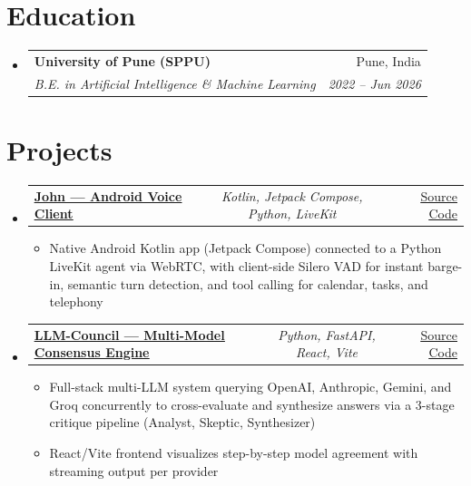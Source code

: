 \documentclass[a4paper,11pt]{article}
\makeatletter
\newcommand{\resumeItem}[1]{
  \item\small{#1}
}
\newcommand{\resumeItemListStart}{\begin{itemize}[rightmargin=0.11in]}
\newcommand{\resumeItemListEnd}{\end{itemize}}
\newcommand{\resumeTrioHeading}[3]{
  \item\small{
    \begin{tabular*}{0.96\textwidth}[t]{
      l@{\extracolsep{\fill}}c@{\extracolsep{\fill}}r
    }
      \textbf{#1} & \textit{#2} & #3
    \end{tabular*}
  }
}
\newcommand{\resumeQuadHeading}[4]{
  \item
  \begin{tabular*}{0.96\textwidth}[t]{l@{\extracolsep{\fill}}r}
    \textbf{#1} & #2 \\
    \textit{\small#3} & \textit{\small #4} \\
  \end{tabular*}
}
\newcommand{\resumeHeadingListStart}{
  \begin{itemize}[leftmargin=0.15in, label={}]
}
\newcommand{\resumeHeadingListEnd}{\end{itemize}}
\makeatother
\begin{document}
\section{Education}
  \resumeHeadingListStart{}
    \resumeQuadHeading{University of Pune (SPPU)}{Pune, India}
    {B.E. in Artificial Intelligence \& Machine Learning}{2022 -- Jun 2026}
  \resumeHeadingListEnd{}



\section{Projects}
  \resumeHeadingListStart{}
    \resumeTrioHeading{\href{https://github.com/thesohamdatta/John}{\uline{John --- Android Voice Client}}}{Kotlin, Jetpack Compose, Python, LiveKit}{\href{https://github.com/thesohamdatta/John}{\uline{Source Code}}}
      \resumeItemListStart{}
        \resumeItem{Native Android Kotlin app (Jetpack Compose) connected to a Python LiveKit agent via WebRTC, with client-side Silero VAD for instant barge-in, semantic turn detection, and tool calling for calendar, tasks, and telephony}
      \resumeItemListEnd{}

      \resumeTrioHeading{\href{https://github.com/thesohamdatta/LLM-Council}{\uline{LLM-Council --- Multi-Model Consensus Engine}}}{Python, FastAPI, React, Vite}{\href{https://github.com/thesohamdatta/LLM-Council}{\uline{Source Code}}}
      \resumeItemListStart{}
        \resumeItem{Full-stack multi-LLM system querying OpenAI, Anthropic, Gemini, and Groq concurrently to cross-evaluate and synthesize answers via a 3-stage critique pipeline (Analyst, Skeptic, Synthesizer)}
        \resumeItem{React/Vite frontend visualizes step-by-step model agreement with streaming output per provider}
      \resumeItemListEnd{}
  \resumeHeadingListEnd{}
\end{document}
